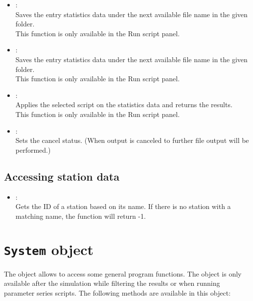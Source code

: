 \begin{itemize}

\item
{}:\\
Saves the entry statistics data under the next available file name in the given folder.\\
This function is only available in the Run script panel.

\item
{}:\\
Saves the entry statistics data under the next available file name in the given folder.\\
This function is only available in the Run script panel.

\item
{}:\\
Applies the selected script on the statistics data and returns the results.\\
This function is only available in the Run script panel.

\item
{}:\\
Sets the cancel status. (When output is canceled to further file output will be performed.)

\end{itemize}

\section{Accessing station data}

\begin{itemize}

\item
{}:\\
Gets the ID of a station based on its name.
If there is no station with a matching name, the function will return -1.

\end{itemize}



\chapter{\texttt{System} object}

The  object allows to access some general program functions.
The  object is only available after the simulation while filtering the results
or when running parameter series scripts.
The following methods are available in this object:

